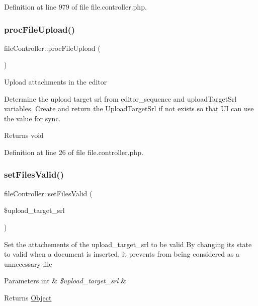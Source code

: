 Definition at line 979 of file file.\+controller.\+php.

\mbox{\label{classfileController_a149fa7253922771172674963f700c2d6}} 
\subsubsection{\texorpdfstring{proc\+File\+Upload()}{procFileUpload()}}
{\footnotesize\ttfamily file\+Controller\+::proc\+File\+Upload (\begin{DoxyParamCaption}{ }\end{DoxyParamCaption})}

Upload attachments in the editor

Determine the upload target srl from editor\+\_\+sequence and upload\+Target\+Srl variables. Create and return the Upload\+Target\+Srl if not exists so that UI can use the value for sync.

\begin{DoxyReturn}{Returns}
void 
\end{DoxyReturn}


Definition at line 26 of file file.\+controller.\+php.

\mbox{\label{classfileController_a801efe17bf09b43279f82504b748c5ee}} 
\subsubsection{\texorpdfstring{set\+Files\+Valid()}{setFilesValid()}}
{\footnotesize\ttfamily file\+Controller\+::set\+Files\+Valid (\begin{DoxyParamCaption}\item[{}]{\$upload\+\_\+target\+\_\+srl }\end{DoxyParamCaption})}

Set the attachements of the upload\+\_\+target\+\_\+srl to be valid By changing its state to valid when a document is inserted, it prevents from being considered as a unnecessary file


\begin{DoxyParams}[1]{Parameters}
int & {\em \$upload\+\_\+target\+\_\+srl} & \\
\hline
\end{DoxyParams}
\begin{DoxyReturn}{Returns}
\hyperlink{classObject}{Object} 
\end{DoxyReturn}


